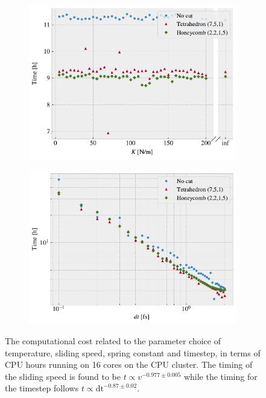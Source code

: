 \begin{figure}[!htb]
\begin{subfigure}[t]{0.49\textwidth}
      \includegraphics[width=\textwidth]{figures/baseline/comp_cost_K.pdf}
      \caption{}
      \label{fig:comp_K}
    \end{subfigure}
    \hfill
    \begin{subfigure}[t]{0.49\textwidth}
        \centering
        \includegraphics[width=\textwidth]{figures/baseline/comp_cost_dt.pdf}
        \caption{}
        \label{fig:comp_dt}
    \end{subfigure}
    \hfill
    \caption{The computational cost related to the parameter choice of temperature, sliding speed, spring
    constant and timestep, in terms of CPU hours running on 16 cores on the
    CPU cluster. The timing of the sliding speed is found to be $t \propto
    v^{-0.977 \pm 0.005}$ while the timing for the timestep follows $t \propto \text{dt}^{-0.87\pm 0.02}$.}
    \label{fig:comp_cost}
\end{figure}


